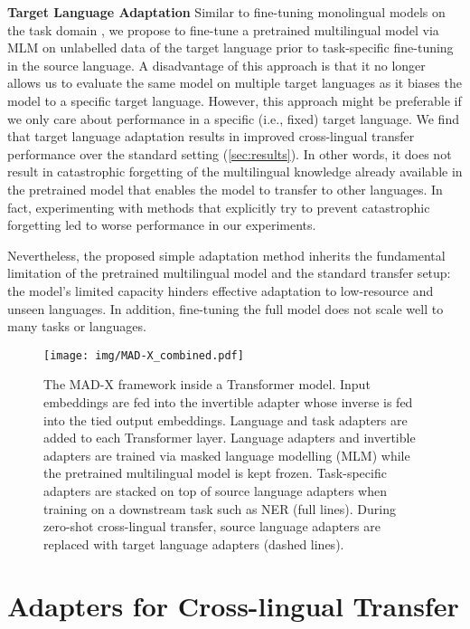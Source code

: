 \documentclass[11pt,a4paper]{article}
\newcommand{\model}[1]{\textsc{MAD-X}}
\begin{document}
\vspace{1.8mm}
\noindent \textbf{Target Language Adaptation} \hspace{0.3mm}
Similar to fine-tuning monolingual models on the task domain \cite{Howard2018ulmfit}, we propose to fine-tune a pretrained multilingual model via MLM on unlabelled data of the target language prior to task-specific fine-tuning in the source language. A disadvantage of this approach is that it no longer allows us to evaluate the same model on multiple target languages as it biases the model to a specific target language. However, this approach might be preferable if we only care about performance in a specific (i.e., fixed) target language. We find that target language adaptation results in improved cross-lingual transfer performance over the standard setting (\textsection \ref{sec:results}). In other words, it does not result in catastrophic forgetting of the multilingual knowledge already available in the pretrained model that enables the model to transfer to other languages. In fact, experimenting with methods that explicitly try to prevent catastrophic forgetting \cite{Wiese2017} led to worse performance in our experiments.
 

Nevertheless, the proposed simple adaptation method inherits the fundamental limitation of the pretrained multilingual model and the standard transfer setup: the model's limited capacity hinders effective adaptation to low-resource and unseen languages. In addition, fine-tuning the full model does not scale well to many tasks or languages.

 
 \begin{figure}[!t] \centering
\texttt{[image: img/MAD-X\_combined.pdf]}
\caption{The \model{} framework inside a Transformer model. Input embeddings are fed into the invertible adapter whose inverse is fed into the tied output embeddings. Language and task adapters are added to each Transformer layer. Language adapters and invertible adapters are trained via masked language modelling (MLM) while the pretrained multilingual model is kept frozen. Task-specific adapters are stacked on top of source language adapters when training on a downstream task such as NER (full lines). During zero-shot cross-lingual transfer, source language adapters are replaced with target language adapters (dashed lines).}
\label{fig:Mad-X_full}
\end{figure}

\section{Adapters for Cross-lingual Transfer}
 
\end{document}
